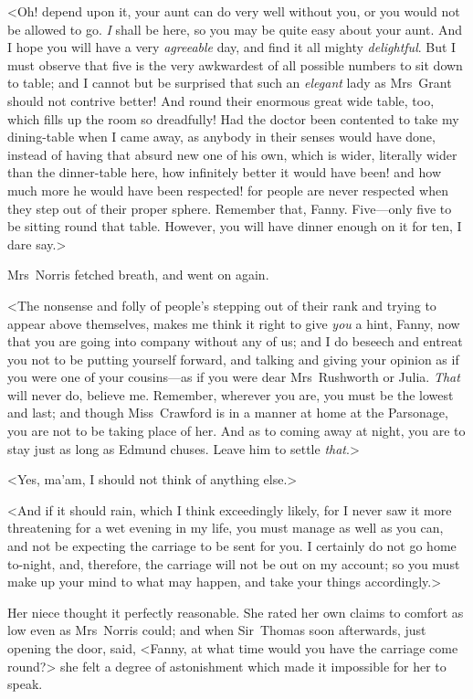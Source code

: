 <Oh! depend upon it, your aunt can do very well without you, or you would not be allowed to go. \textit{I}  shall be here, so you may be quite easy about your aunt. And I hope you will have a very \textit{agreeable}  day, and find it all mighty \textit{delightful}. But I must observe that five is the very awkwardest of all possible numbers to sit down to table; and I cannot but be surprised that such an \textit{elegant}  lady as Mrs~Grant should not contrive better! And round their enormous great wide table, too, which fills up the room so dreadfully! Had the doctor been contented to take my dining-table when I came away, as anybody in their senses would have done, instead of having that absurd new one of his own, which is wider, literally wider than the dinner-table here, how infinitely better it would have been! and how much more he would have been respected! for people are never respected when they step out of their proper sphere. Remember that, Fanny. Five—only five to be sitting round that table. However, you will have dinner enough on it for ten, I dare say.>

Mrs~Norris fetched breath, and went on again.

<The nonsense and folly of people's stepping out of their rank and trying to appear above themselves, makes me think it right to give \textit{you}  a hint, Fanny, now that you are going into company without any of us; and I do beseech and entreat you not to be putting yourself forward, and talking and giving your opinion as if you were one of your cousins—as if you were dear Mrs~Rushworth or Julia. \textit{That}  will never do, believe me. Remember, wherever you are, you must be the lowest and last; and though Miss~Crawford is in a manner at home at the Parsonage, you are not to be taking place of her. And as to coming away at night, you are to stay just as long as Edmund chuses. Leave him to settle \textit{that}.>

<Yes, ma'am, I should not think of anything else.>

<And if it should rain, which I think exceedingly likely, for I never saw it more threatening for a wet evening in my life, you must manage as well as you can, and not be expecting the carriage to be sent for you. I certainly do not go home to-night, and, therefore, the carriage will not be out on my account; so you must make up your mind to what may happen, and take your things accordingly.>

Her niece thought it perfectly reasonable. She rated her own claims to comfort as low even as Mrs~Norris could; and when Sir~Thomas soon afterwards, just opening the door, said, <Fanny, at what time would you have the carriage come round?> she felt a degree of astonishment which made it impossible for her to speak.

